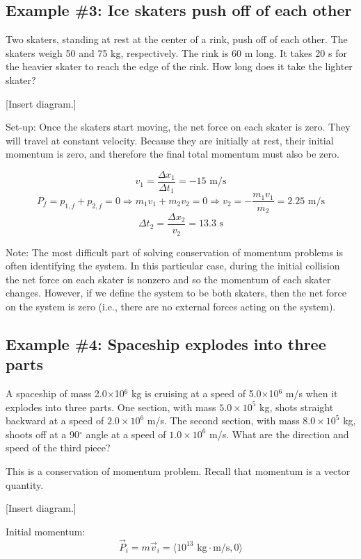 \subsection{Example \#3: Ice skaters push off of each other}
Two skaters, standing at rest at the center of a rink, push off of each other. The skaters weigh 50 and 75 kg, respectively. The rink is 60 m long. It takes 20 s for the heavier skater to reach the edge of the rink. How long does it take the lighter skater?

[Insert diagram.]

Set-up: Once the skaters start moving, the net force on each skater is zero. They will travel at constant velocity. Because they are initially at rest, their initial momentum is zero, and therefore the final total momentum must also be zero.

$$v_1=\frac{\Delta{x_1}}{\Delta{t_1}}=-15\mbox{ m/s}$$
$$P_f=p_{1,f}+p_{2,f}=0\Rightarrow m_1v_1+m_2v_2=0\Rightarrow v_2=-\frac{m_1v_1}{m_2}=2.25\mbox{ m/s}$$
$$\Delta{t_2}=\frac{\Delta{x_2}}{v_2}=13.3\mbox{ s}$$

Note: The most difficult part of solving conservation of momentum problems is often identifying the system. In this particular case, during the initial collision the net force on each skater is nonzero and so the momentum of each skater changes. However, if we define the system to be both skaters, then the net force on the system is zero (i.e., there are no external forces acting on the system).

\subsection{Example \#4: Spaceship explodes into three parts}
A spaceship of mass 2.0$\times$10$^6$ kg is cruising at a speed of 5.0$\times$10$^6$ m/s when it explodes into three parts. One section, with mass $5.0\times 10^5$ kg, shots straight backward at a speed of $2.0\times 10^6$ m/s. The second section, with mass $8.0\times 10^5$ kg, shoots off at a 90$^\circ$ angle at a speed of $1.0\times 10^6$ m/s. What are the direction and speed of the third piece?

This is a conservation of momentum problem. Recall that momentum is a vector quantity.


[Insert diagram.]\nopagebreak
\vspace{4cm}

Initial momentum: 
$$\vec{P}_i=m\vec{v}_i=\langle{10^{13}\mbox{ kg}\cdot\mbox{m/s}, 0}\rangle$$


